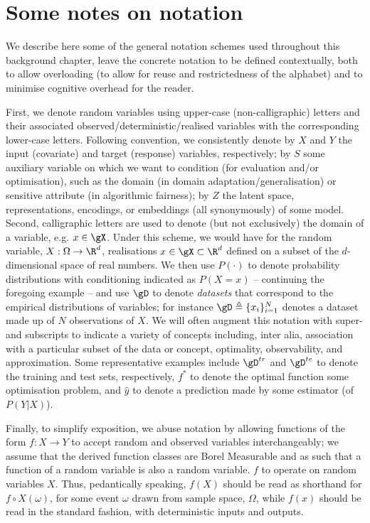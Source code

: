 \section{Some notes on notation}\label{sec:notation}
We describe here some of the general notation schemes used throughout this background chapter,
leave the concrete notation to be defined contextually, both to allow overloading (to allow for
reuse and restrictedness of the alphabet) and to minimise cognitive overhead for the reader.

%
First, we denote random variables using upper-case (non-calligraphic) letters and their associated
observed/deterministic/realised variables with the corresponding lower-case letters.
%
Following convention, we consistently denote by \(X\) and \(Y\) the input (covariate) and
target (response) variables, respectively; by \(S\) some auxiliary variable on which we want to
condition (for evaluation and/or optimisation), such as the domain (in domain
adaptation/generalisation) or sensitive attribute (in algorithmic fairness); by \(Z\) the latent
space, representations, encodings, or embeddings (all synonymously) of some model.
%
Second, calligraphic letters are used to denote (but not exclusively) the domain of a variable,
e.g. \(x \in \gX \).
%
Under this scheme, we would have for the random variable, \(X: \Omega \to \R^d \), realisations \(x
\in \gX \subset \R^d \) defined on a subset of the \(d\)-dimensional space of real numbers.
%
We then use \(P(\cdot)\) to denote probability distributions with conditioning indicated as
\(P(X=x)\) -- continuing the foregoing example -- and use \(\gD\) to denote \emph{datasets} that
correspond to the empirical distributions of variables; for instance \(\gD \triangleq
\{x_i\}_{i=1}^N \) denotes a dataset made up of \(N\) observations of \(X\).
%
We will often augment this notation with super- and subscripts to indicate a variety of concepts
including, inter alia, association with a particular subset of the data or concept, optimality,
observability, and approximation.
%
Some representative examples include \(\gD^{tr}\) and \(\gD^{te}\) to denote the training and test
sets, respectively, \(f^\ast\) to denote the optimal function \wrt{} some optimisation problem, and
\(\hat{y}\) to denote a prediction made by some estimator (of \(P(Y|X)\)).
%

%
Finally, to simplify exposition, we abuse notation by allowing functions of the form \(f: X \to Y
\) to accept random and observed variables interchangeably; we assume that the derived function
classes are Borel Measurable and as such that a function of a random variable is also a random
variable. \(f\) to operate on random variables \(X\).
Thus, pedantically speaking, \( f(X) \) should be read as shorthand for \( f \circ X(\omega) \),
for some event \( \omega \) drawn from sample space, \( \Omega \), while \( f(x) \) should be read
in the standard fashion, with deterministic inputs and outputs.
